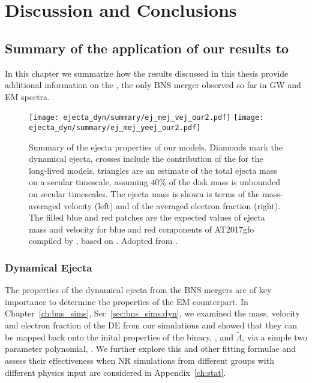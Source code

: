\chapter{Discussion and Conclusions}\label{ch:conclusion} %

\section{Summary of the application of our results to \GW{}}

In this chapter we summarize how the results discussed in this thesis 
provide additional information on the \GW{}, the only \ac{BNS} merger 
observed so far in \ac{GW} and \ac{EM} spectra.


\begin{figure*}[t]
    \centering 
    \texttt{[image: ejecta\_dyn/summary/ej\_mej\_vej\_our2.pdf]}
    \texttt{[image: ejecta\_dyn/summary/ej\_mej\_yeej\_our2.pdf]}
    \caption{
        Summary of the ejecta properties of our models.
        Diamonds mark the dynamical ejecta, crosses include the
        contribution of the \swind{} for the long-lived models, 
        triangles are an estimate of the total ejecta mass on a secular
        timescale, assuming $40\%$ of the disk mass is unbounded on
        secular timescales.         
        The ejecta mass is shown is terms of the mass-averaged velocity
        (left) and of the averaged electron fraction (right).
        The filled blue and red patches are the expected values of
        ejecta mass and velocity for blue and red components of
        AT2017gfo compiled by \cite{Siegel:2019mlp}, based on
        \cite{Villar:2017wcc}. 
        Adopted from \citet{Nedora:2020pak}.
    }
    \label{fig:ejecta:dyn:ds_sww}
\end{figure*}





\subsection{Dynamical Ejecta}


The properties of the dynamical ejecta from the \ac{BNS} mergers are of key 
importance to determine the properties of the \ac{EM} counterpart. 
%
In Chapter~\ref{ch:bns_sims}, Sec~\ref{sec:bns_sims:dyn}, we examined the mass, 
velocity and electron fraction of the \ac{DE} from our simulations and showed 
that they can be mapped back onto the inital properties of the binary, \ie, 
\mr{} and $\tilde{\Lambda}$, via a simple two parameter polynomial, \polql{}. 
%
We further explore this and other fitting formulae and assess their effectiveness 
when \ac{NR} simulations from different groups with different physics input are 
considered in Appendix~\ref{ch:stat}.
%


